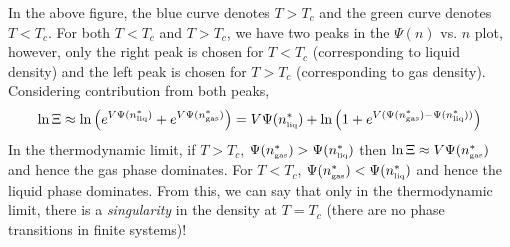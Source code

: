 In the above figure, the blue curve denotes $T>T_c$ and the green curve denotes $T<T_c$. For both $T<T_c$ and $T>T_c$, we have two peaks in the $\Psi(n)$ vs. $n$ plot, however, only the right peak is chosen for $T<T_c$ (corresponding to liquid density) and the left peak is chosen for $T>T_c$ (corresponding to gas density). Considering contribution from both peaks,
\begin{align*}
    \ln\Xi \approx \ln\qty(e^{V\Psi(n^*_{\text{\tiny liq}})}+e^{V\Psi(n^*_{\text{\tiny gas}})}) =V\Psi(n^*_{\text{\tiny liq}})+ \ln\qty(1+e^{V(\Psi(n^*_{\text{\tiny gas}})-\Psi(n^*_{\text{\tiny liq}}))})
\end{align*}
In the thermodynamic limit, if $T>T_c$, $\Psi(n^*_{\text{\tiny gas}})>\Psi(n^*_{\text{\tiny liq}})$ then $\ln\Xi \approx V\Psi(n^*_{\text{\tiny gas}})$ and hence the gas phase dominates. For $T<T_c$, $\Psi(n^*_{\text{\tiny gas}})<\Psi(n^*_{\text{\tiny liq}})$ and hence the liquid phase dominates. From this, we can say that only in the thermodynamic limit, there is a \textit{singularity} in the density at $T=T_c$ (there are no phase transitions in finite systems)!